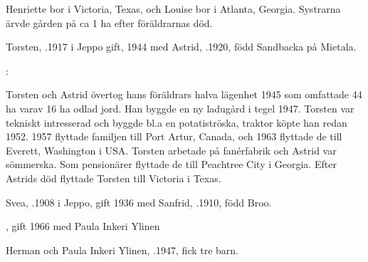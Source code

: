 %
Henriette bor i Victoria, Texas, och Louise bor i Atlanta, Georgia. Systrarna ärvde gården på ca 1 ha efter föräldrarnas död.\jhvspace{}


%
Torsten, .1917 i Jeppo gift, 1944 med Astrid, .1920, född Sandbacka på Mietala.
\begin{jhchildren}
  \item {}
  \item {}
\end{jhchildren}
:

Torsten och Astrid övertog hans föräldrars halva lägenhet 1945 som 	omfattade 44 ha varav 16 ha odlad jord. Han byggde en ny ladugård i tegel 1947. Torsten var tekniskt intresserad och byggde bl.a en potatiströska, traktor köpte han redan 1952. 1957 flyttade familjen till Port Artur, Canada, och 1963 flyttade de till Everett, Washington i USA. Torsten arbetade på fanérfabrik och Astrid var sömmerska. Som pensionärer flyttade de till Peachtree City i Georgia. Efter Astrids död flyttade Torsten till Victoria i Texas.


%
Svea, .1908 i Jeppo, gift 1936 med Sanfrid, .1910, född Broo.
\begin{jhchildren}
  \item {}
  \item {}
  \item {}, gift 1966 med Paula Inkeri Ylinen
\end{jhchildren}

Herman och Paula Inkeri Ylinen, .1947, fick tre barn.
\begin{jhchildren}
  \item {}
  \item {}
  \item {}
\end{jhchildren}

